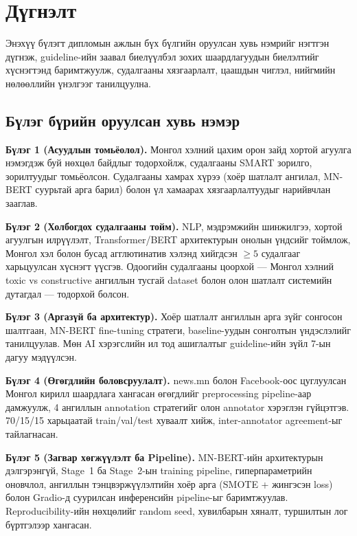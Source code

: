 
\chapter{Дүгнэлт}
\label{Chapter8}

Энэхүү бүлэгт дипломын ажлын бүх бүлгийн оруулсан хувь нэмрийг нэгтгэн дүгнэж,
guideline-ийн заавал биелүүлбэл зохих шаардлагуудын биелэлтийг хүснэгтэнд
баримтжуулж, судалгааны хязгаарлалт, цаашдын чиглэл, нийгмийн нөлөөллийн
үнэлгээг танилцуулна.

\section{Бүлэг бүрийн оруулсан хувь нэмэр}

\textbf{Бүлэг 1 (Асуудлын томьёолол).} Монгол хэлний цахим орон зайд хортой
агуулга нэмэгдэж буй нөхцөл байдлыг тодорхойлж, судалгааны SMART зорилго,
зорилтуудыг томьёолсон. Судалгааны хамрах хүрээ (хоёр шатлалт ангилал, MN-BERT
суурьтай арга барил) болон үл хамаарах хязгаарлалтуудыг нарийвчлан зааглав.

\textbf{Бүлэг 2 (Холбогдох судалгааны тойм).} NLP, мэдрэмжийн шинжилгээ, хортой
агуулгын илрүүлэлт, Transformer/BERT архитектурын онолын үндсийг тоймлож,
Монгол хэл болон бусад агглютинатив хэлэнд хийгдсэн $\geq\!5$ судалгааг
харьцуулсан хүснэгт үүсгэв. Одоогийн судалгааны цоорхой --- Монгол хэлний
toxic vs constructive ангиллын тусгай dataset болон олон шатлалт системийн
дутагдал --- тодорхой болсон.

\textbf{Бүлэг 3 (Аргазүй ба архитектур).} Хоёр шатлалт ангиллын арга зүйг
сонгосон шалтгаан, MN-BERT fine-tuning стратеги, baseline-уудын сонголтын
үндэслэлийг танилцуулав. Мөн AI хэрэгслийн ил тод ашиглалтыг guideline-ийн
зүйл 7-ын дагуу мэдүүлсэн.

\textbf{Бүлэг 4 (Өгөгдлийн боловсруулалт).} news.mn болон Facebook-оос цуглуулсан
Монгол кирилл шаардлага хангасан өгөгдлийг preprocessing pipeline-аар дамжуулж,
4 ангиллын annotation стратегийг олон annotator хэрэглэн гүйцэтгэв. 70/15/15
харьцаатай train/val/test хуваалт хийж, inter-annotator agreement-ыг тайлагнасан.

\textbf{Бүлэг 5 (Загвар хөгжүүлэлт ба Pipeline).} MN-BERT-ийн архитектурын
дэлгэрэнгүй, Stage~1 ба Stage~2-ын training pipeline, гиперпараметрийн оновчлол,
ангиллын тэнцвэржүүлэлтийн хоёр арга (SMOTE + жингэсэн loss) болон Gradio-д
суурилсан инференсийн pipeline-ыг баримтжуулав. Reproducibility-ийн нөхцөлийг
random seed, хувилбарын хяналт, туршилтын лог бүртгэлээр хангасан.

